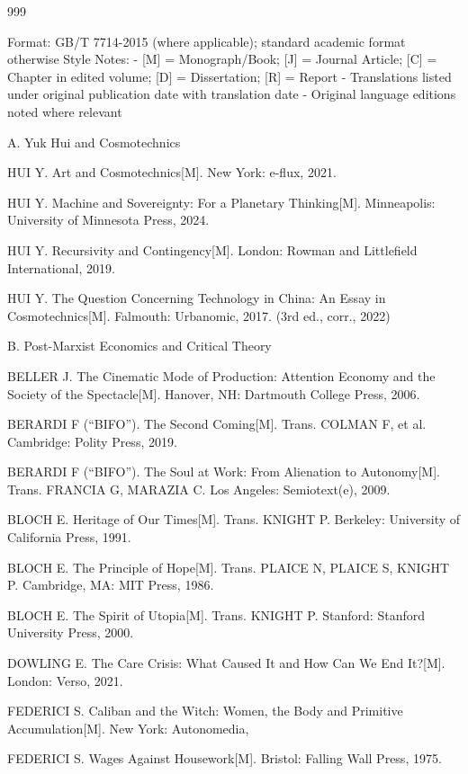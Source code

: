 \begin{thebibliography}{999}
\bibitem{} Format: GB/T 7714-2015 (where applicable); standard academic format otherwise Style Notes: - [M] = Monograph/Book; [J] = Journal Article; [C] = Chapter in edited volume; [D] = Dissertation; [R] = Report - Translations listed under original publication date with translation date - Original language editions noted where relevant

\bibitem{} A. Yuk Hui and Cosmotechnics

\bibitem{} HUI Y. Art and Cosmotechnics[M]. New York: e-flux, 2021.

\bibitem{} HUI Y. Machine and Sovereignty: For a Planetary Thinking[M]. Minneapolis: University of Minnesota Press, 2024.

\bibitem{} HUI Y. Recursivity and Contingency[M]. London: Rowman and Littlefield International, 2019.

\bibitem{} HUI Y. The Question Concerning Technology in China: An Essay in Cosmotechnics[M]. Falmouth: Urbanomic, 2017. (3rd ed., corr., 2022)

\bibitem{} B. Post-Marxist Economics and Critical Theory

\bibitem{} BELLER J. The Cinematic Mode of Production: Attention Economy and the Society of the Spectacle[M]. Hanover, NH: Dartmouth College Press, 2006.

\bibitem{} BERARDI F (“BIFO”). The Second Coming[M]. Trans. COLMAN F, et al. Cambridge: Polity Press, 2019.

\bibitem{} BERARDI F (“BIFO”). The Soul at Work: From Alienation to Autonomy[M]. Trans. FRANCIA G, MARAZIA C. Los Angeles: Semiotext(e), 2009.

\bibitem{} BLOCH E. Heritage of Our Times[M]. Trans. KNIGHT P. Berkeley: University of California Press, 1991.

\bibitem{} BLOCH E. The Principle of Hope[M]. Trans. PLAICE N, PLAICE S, KNIGHT P. Cambridge, MA: MIT Press, 1986.

\bibitem{} BLOCH E. The Spirit of Utopia[M]. Trans. KNIGHT P. Stanford: Stanford University Press, 2000.

\bibitem{} DOWLING E. The Care Crisis: What Caused It and How Can We End It?[M]. London: Verso, 2021.

\bibitem{} FEDERICI S. Caliban and the Witch: Women, the Body and Primitive Accumulation[M]. New York: Autonomedia,

\bibitem{} FEDERICI S. Wages Against Housework[M]. Bristol: Falling Wall Press, 1975.


\end{thebibliography}
